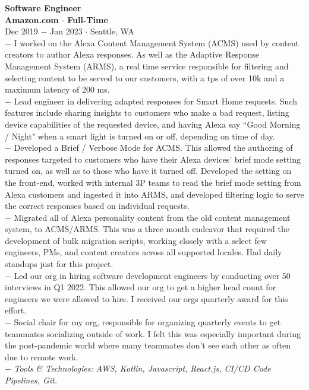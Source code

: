 \documentclass{resume}
\begin{document}
\begin{flushleft}
\normalsize{\bf Software Engineer}\\
\footnotesize{\bf Amazon.com $\cdot$ Full-Time}\\
\footnotesize{Dec 2019 $-$ Jan 2023 $\cdot$ Seattle, WA}\\[1mm]
{\scriptsize
	$-$ I worked on the Alexa Content Management System (ACMS) used by content creators to author Alexa responses. As well as the Adaptive Response Management System (ARMS), a real time service responsible for filtering and selecting content to be served to our customers, with a tps of over 10k  and a maximum latency of 200 ms. \\
	$-$ Lead engineer in delivering adapted responses for Smart Home requests. Such features include sharing insights to customers who make a bad request, listing device capabilities of the requested device, and having Alexa say ``Good Morning / Night" when a smart light is turned on or off, depending on time of day. \\
	$-$ Developed a Brief / Verbose Mode for ACMS. This allowed the authoring of responses targeted to customers who have their Alexa devices' brief mode setting turned on, as well as to those who have it turned off. Developed the setting on the front-end, worked with internal 3P teams to read the brief mode setting from Alexa customers and ingested it into ARMS, and developed filtering logic to serve the correct responses based on individual requests. \\
	$-$ Migrated all of Alexa personality content from the old content management system, to ACMS/ARMS. This was a three month endeavor that required the development of bulk migration scripts, working closely with a select few engineers, PMs, and content creators across all supported locales. Had daily standups just for this project. \\
	$-$ Led our org in hiring software development engineers by conducting over 50 interviews in Q1 2022. This allowed our org to get a higher  head count for engineers we were allowed to hire. I received our orgs quarterly award for this effort. \\
	$-$ Social chair for my org, responsible for organizing quarterly events to get teammates socializing outside of work. I felt this was especially important during the post-pandemic world where many teammates don't see each other as often due to remote work. \\
	$-$ \textit{Tools \& Technologies: AWS, Kotlin, Javascript, React.js, CI/CD Code Pipelines, Git.}
}\\[3mm]


\end{flushleft}
\end{document}
